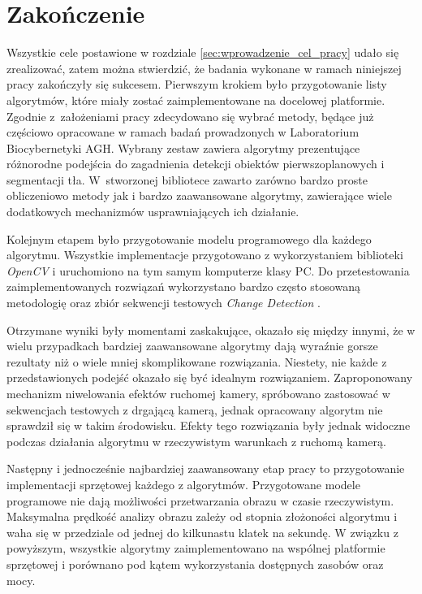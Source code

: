 \chapter{Zakończenie}
\label{cha:zakonczenie}

Wszystkie cele postawione w rozdziale \ref{sec:wprowadzenie_cel_pracy} udało się zrealizować, zatem można stwierdzić, że badania wykonane w ramach niniejszej pracy zakończyły się sukcesem. Pierwszym krokiem było przygotowanie listy algorytmów, które miały zostać zaimplementowane na docelowej platformie. Zgodnie z~założeniami pracy zdecydowano się wybrać metody, będące już częściowo opracowane w ramach badań prowadzonych w Laboratorium Biocybernetyki AGH. Wybrany zestaw zawiera algorytmy prezentujące różnorodne podejścia do zagadnienia detekcji obiektów pierwszoplanowych i segmentacji tła. W~stworzonej bibliotece zawarto zarówno bardzo proste obliczeniowo metody jak i bardzo zaawansowane algorytmy, zawierające wiele dodatkowych mechanizmów usprawniających ich działanie.

Kolejnym etapem było przygotowanie modelu programowego dla każdego algorytmu. Wszystkie implementacje przygotowano z wykorzystaniem biblioteki \textit{OpenCV} i uruchomiono na tym samym komputerze klasy PC. Do przetestowania zaimplementowanych rozwiązań wykorzystano bardzo często stosowaną metodologię \cite{changedetection_15} oraz zbiór sekwencji testowych \textit{Change Detection} \cite{change_detection_web}. 

Otrzymane wyniki były momentami zaskakujące, okazało się między innymi, że w wielu przypadkach bardziej zaawansowane algorytmy dają wyraźnie gorsze rezultaty niż o wiele mniej skomplikowane rozwiązania. 
Niestety, nie każde z przedstawionych podejść okazało się być idealnym rozwiązaniem. 
Zaproponowany mechanizm niwelowania efektów ruchomej kamery, spróbowano zastosować w sekwencjach testowych z drgającą kamerą, jednak opracowany algorytm nie sprawdził się w takim środowisku.
Efekty tego rozwiązania były jednak widoczne podczas działania algorytmu w rzeczywistym warunkach z ruchomą kamerą. 


Następny i jednocześnie najbardziej zaawansowany etap pracy to przygotowanie implementacji sprzętowej każdego z algorytmów. Przygotowane modele programowe nie dają możliwości przetwarzania obrazu w czasie rzeczywistym. Maksymalna prędkość analizy obrazu zależy od stopnia złożoności algorytmu i waha się w przedziale od jednej do kilkunastu klatek na sekundę. W związku z powyższym, wszystkie algorytmy zaimplementowano na wspólnej platformie sprzętowej i porównano pod kątem wykorzystania dostępnych zasobów oraz mocy.

